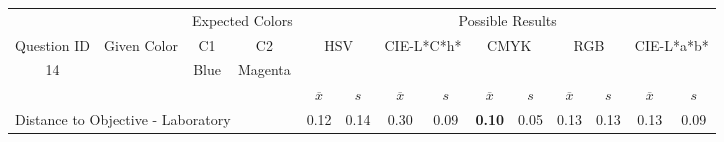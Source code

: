 \begin{table}[H]
  \resizebox{\textwidth}{!} {
  \begin{tabular}{lccccccccccccc}
    \hline
    \multicolumn{1}{c}{}                              &                                      & \multicolumn{2}{c}{Expected Colors}                   & \multicolumn{10}{c}{Possible Results}                                                                                                                                                                                                                                                                                        \\ \cline{3-14}
    \multicolumn{1}{c}{\multirow{-2}{*}{Question ID}} & \multirow{-2}{*}{Given Color}        & C1                       & C2                         & \multicolumn{2}{c}{HSV}                                        & \multicolumn{2}{c}{CIE-L*C*h*}                                 & \multicolumn{2}{c}{CMYK}                                       & \multicolumn{2}{c}{RGB}                                        & \multicolumn{2}{c}{CIE-L*a*b*}                                 \\ \hline
    \multicolumn{1}{c}{14}                             & \cellcolor[HTML]{8000FF}{\color[HTML]{FFFFFF}(27, 12, 95)} & \multicolumn{1}{c|}{Blue} & \multicolumn{1}{c|}{Magenta}  & \multicolumn{2}{c|}{\cellcolor[HTML]{8000FF}{\color[HTML]{FFFFFF}(27, 12, 95)}}      & \multicolumn{2}{c|}{\cellcolor[HTML]{B000FF}{\color[HTML]{FFFFFF}(36, 16, 96)}}       & \multicolumn{2}{c|}{\cellcolor[HTML]{8000FF}{\color[HTML]{FFFFFF}(27, 12, 95)}}       & \multicolumn{2}{c|}{\cellcolor[HTML]{8000FF}{\color[HTML]{FFFFFF}(27, 12, 95)}}       & \multicolumn{2}{c|}{\cellcolor[HTML]{AB00FF}{\color[HTML]{FFFFFF}(35, 16, 96)}}       \\ \hline
                                                      & \multicolumn{1}{l}{}                 & \multicolumn{1}{l}{}     & \multicolumn{1}{l}{}       & \multicolumn{1}{c}{$\overline{x}$} & \multicolumn{1}{c}{$s$} & \multicolumn{1}{c}{$\overline{x}$} & \multicolumn{1}{c}{$s$} & \multicolumn{1}{c}{$\overline{x}$} & \multicolumn{1}{c}{$s$} & \multicolumn{1}{c}{$\overline{x}$} & \multicolumn{1}{c}{$s$} & \multicolumn{1}{c}{$\overline{x}$} & \multicolumn{1}{c}{$s$} \\ \hline
    \multicolumn{4}{l}{Distance to Objective - Laboratory}                                                                                           & \multicolumn{1}{|c}{0.12}       & \multicolumn{1}{c|}{0.14}    & \multicolumn{1}{|c}{0.30}       & \multicolumn{1}{c|}{0.09}    & \multicolumn{1}{|c}{\textbf{0.10}}       & \multicolumn{1}{c|}{0.05}    & \multicolumn{1}{|c}{0.13}       & \multicolumn{1}{c|}{0.13}    & \multicolumn{1}{|c}{0.13}       & \multicolumn{1}{c|}{0.09}    \\

\end{tabular}}
\end{table}
